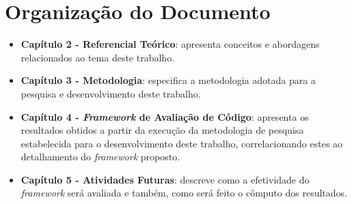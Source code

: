 \section{Organização do Documento}

\begin{itemize}
	\item \textbf{Capítulo 2 - Referencial Teórico}: apresenta conceitos e abordagens relacionados ao tema deste trabalho.

	\item \textbf{Capítulo 3 - Metodologia}: especifica a metodologia adotada para a pesquisa e desenvolvimento deste trabalho.

	\item \textbf{Capítulo 4 - \textit{Framework} de Avaliação de Código}: apresenta os resultados obtidos a partir da execução da metodologia de pesquisa estabelecida para o desenvolvimento deste trabalho, correlacionando estes ao detalhamento do \textit{framework} proposto.

	\item \textbf{Capítulo 5 - Atividades Futuras}: descreve como a efetividade do \textit{framework} será avaliada e também, como será feito o cômputo dos resultados.
\end{itemize}